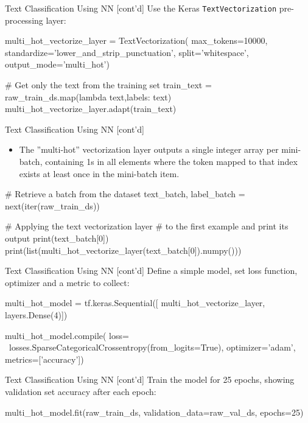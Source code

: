 \documentclass[ignorenonframetext,xcolor=x11names]{beamer}
\begin{document}
\begin{frame}[fragile]{Text Classification Using NN \small [cont'd]}
Use the Keras \texttt{TextVectorization} pre-processing layer:
\begin{pythoncode}
multi_hot_vectorize_layer = TextVectorization(
    max_tokens=10000,
    standardize='lower_and_strip_punctuation',
    split='whitespace',
    output_mode='multi_hot')
    
# Get only the text from the training set
train_text = raw_train_ds.map(lambda text,labels: text)
multi_hot_vectorize_layer.adapt(train_text)
\end{pythoncode}
\end{frame}


\begin{frame}[fragile]{Text Classification Using NN \small [cont'd]}
\begin{itemize}
   \item The ''multi-hot'' vectorization layer outputs a single integer array per mini-batch, containing 1s in all elements where the token mapped to that index exists at least once in the mini-batch item. 
\end{itemize}

\begin{pythoncode}
# Retrieve a batch from the dataset
text_batch, label_batch = next(iter(raw_train_ds))

# Applying the text vectorization layer 
# to the first example and print its output
print(text_batch[0])
print(list(multi_hot_vectorize_layer(text_batch[0]).numpy()))
\end{pythoncode}
\end{frame}

\begin{frame}[fragile]{Text Classification Using NN \small [cont'd]}
Define a simple model, set loss function, optimizer and a metric to collect:
\begin{pythoncode}
multi_hot_model = tf.keras.Sequential([
    multi_hot_vectorize_layer,
    layers.Dense(4)])

multi_hot_model.compile(
    loss= \
losses.SparseCategoricalCrossentropy(from_logits=True),
    optimizer='adam',
    metrics=['accuracy'])
\end{pythoncode}
\end{frame}

\begin{frame}[fragile]{Text Classification Using NN \small [cont'd]}
Train the model for 25 epochs, showing validation set accuracy after each epoch:
\begin{pythoncode}
multi_hot_model.fit(raw_train_ds, 
                    validation_data=raw_val_ds, 
                    epochs=25)
\end{pythoncode}
\end{frame}
\end{document}

